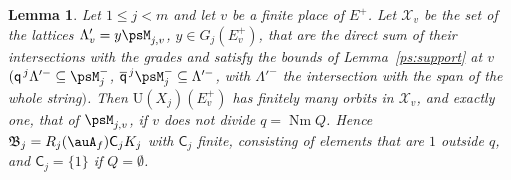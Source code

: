 \documentclass[10pt]{amsart}
\newtheorem{lemma}[theorem]{Lemma}
\theoremstyle{definition}
\theoremstyle{remark}
\providecommand{\auNm}{\operatorname{Nm}}
\providecommand{\auU}{\mathrm U}
\providecommand{\aubar}[1]{\overline{#1}}
\begin{document}
\begin{lemma}\label{pf:orbits}
Let $1\le j<m$ and let $v$ be a finite place of $E^+$. Let $\mathcal X_v$ be the set of the
lattices $\Lambda'_v=y\psM_{j,v}$, $y\in G_j(E^+_v)$, that are the direct sum of their intersections
with the grades and satisfy the bounds of Lemma~\ref{ps:support} at $v$ $(\mathsf q^{\,j}\Lambda'^-\subseteq
\psM_j^-$, $\aubar{\mathsf q}^{\,j}\psM_j^-\subseteq\Lambda'^-$, with $\Lambda'^-$ the intersection
with the span of the whole string$)$. Then $\auU(X_j)(E^+_v)$ has finitely many orbits in
$\mathcal X_v$, and exactly one, that of $\psM_{j,v}$, if $v$ does not divide $q=\auNm Q$. Hence
$\mathfrak B_j=R_j(\auA_f)\mathsf C_jK_j$ with $\mathsf C_j$ finite, consisting of elements that are
$1$ outside $q$, and $\mathsf C_j=\{1\}$ if $Q=\emptyset$.
\end{lemma}
\end{document}
